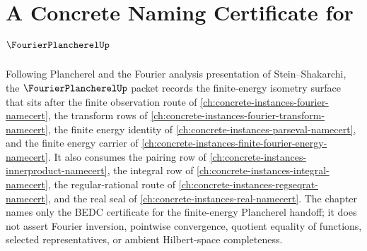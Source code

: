 \chapter{A Concrete Naming Certificate for $\FourierPlancherelUp$}
\label{ch:concrete-instances-fourier-plancherel-namecert}

Following Plancherel and the Fourier analysis presentation of Stein--Shakarchi, the $\FourierPlancherelUp$ packet records the finite-energy isometry surface that sits after the finite observation route of \autoref{ch:concrete-instances-fourier-namecert}, the transform rows of \autoref{ch:concrete-instances-fourier-transform-namecert}, the finite energy identity of \autoref{ch:concrete-instances-parseval-namecert}, and the finite energy carrier of \autoref{ch:concrete-instances-finite-fourier-energy-namecert}. It also consumes the pairing row of \autoref{ch:concrete-instances-innerproduct-namecert}, the integral row of \autoref{ch:concrete-instances-integral-namecert}, the regular-rational route of \autoref{ch:concrete-instances-regseqrat-namecert}, and the real seal of \autoref{ch:concrete-instances-real-namecert}. The chapter names only the BEDC certificate for the finite-energy Plancherel handoff; it does not assert Fourier inversion, pointwise convergence, quotient equality of functions, selected representatives, or ambient Hilbert-space completeness.

